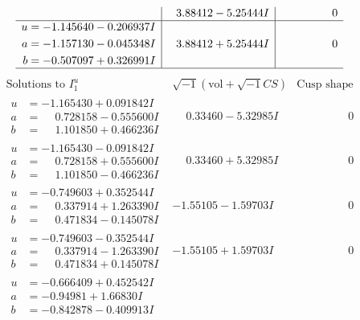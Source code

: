 \documentclass[1p]{elsarticle_modified}
\theoremstyle{definition}
\newcommand{\I}{\sqrt{-1}}
\begin{document}
$$\begin{array}{c|c|c}
 & \phantom{-}3.88412 - 5.25444 I & \phantom{-0.000000 } 0 \\ \hline\begin{aligned}
u &= -1.145640 - 0.206937 I \\
a &= -1.157130 - 0.045348 I \\
b &= -0.507097 + 0.326991 I\end{aligned}
 & \phantom{-}3.88412 + 5.25444 I & \phantom{-0.000000 } 0\\
 \hline 
 \end{array}$$\newpage$$\begin{array}{c|c|c}  
\text{Solutions to }I^u_{1}& \I (\text{vol} + \sqrt{-1}CS) & \text{Cusp shape}\\
 \hline 
\begin{aligned}
u &= -1.165430 + 0.091842 I \\
a &= \phantom{-}0.728158 - 0.555600 I \\
b &= \phantom{-}1.101850 + 0.466236 I\end{aligned}
 & \phantom{-}0.33460 - 5.32985 I & \phantom{-0.000000 } 0 \\ \hline\begin{aligned}
u &= -1.165430 - 0.091842 I \\
a &= \phantom{-}0.728158 + 0.555600 I \\
b &= \phantom{-}1.101850 - 0.466236 I\end{aligned}
 & \phantom{-}0.33460 + 5.32985 I & \phantom{-0.000000 } 0 \\ \hline\begin{aligned}
u &= -0.749603 + 0.352544 I \\
a &= \phantom{-}0.337914 + 1.263390 I \\
b &= \phantom{-}0.471834 - 0.145078 I\end{aligned}
 & -1.55105 - 1.59703 I & \phantom{-0.000000 } 0 \\ \hline\begin{aligned}
u &= -0.749603 - 0.352544 I \\
a &= \phantom{-}0.337914 - 1.263390 I \\
b &= \phantom{-}0.471834 + 0.145078 I\end{aligned}
 & -1.55105 + 1.59703 I & \phantom{-0.000000 } 0 \\ \hline\begin{aligned}
u &= -0.666409 + 0.452542 I \\
a &= -0.94981 + 1.66830 I \\
b &= -0.842878 - 0.409913 I\end{aligned}

\end{array}$$
\end{document}
